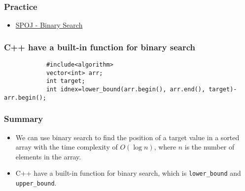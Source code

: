 \documentclass[xcolor=dvipsnames]{beamer}
\begin{document}
    \begin{frame}
        \frametitle{Practice}
        \begin{itemize}
            \item \href{https://www.spoj.com/problems/BSEARCH1/en/}{SPOJ - Binary Search}
        \end{itemize}
    \end{frame}
        

    \scriptsize
    \begin{frame}[fragile]
        \frametitle{C++ have a built-in function for binary search}
        \begin{verbatim}
            #include<algorithm>
            vector<int> arr;
            int target;
            int idnex=lower_bound(arr.begin(), arr.end(), target)-arr.begin();

        \end{verbatim}
    \end{frame}


    \begin{frame}
        \frametitle{Summary}
        \begin{itemize}
            \item We can use binary search to find the position of a target value in a sorted array 
                with the time complexity of $O(\log n)$, 
                where $n$ is the number of elements in the array.
            \item C++ have a built-in function for binary search,
                which is \texttt{lower\_bound} and \texttt{upper\_bound}.
        \end{itemize}

        
    \end{frame}
\end{document}
